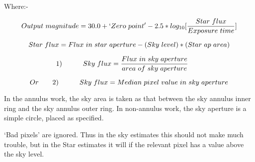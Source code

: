 \begin{small}
{{   Where:-

   $$ Output{\hspace{0.3em}}magnitude = 30.0 +
                                        `Zero{\hspace{0.3em}}point' -
      2.5*log_{10}[\frac{Star{\hspace{0.3em}}flux}{Exposure{
      \hspace{0.3em}}time}] $$

$$   Star{\hspace{0.3em}}flux = Flux{\hspace{0.3em}}in{
         \hspace{0.3em}}star{\hspace{0.3em}}aperture -
         (Sky{\hspace{0.3em}}level)*(Star{\hspace{0.3em}}ap{
         \hspace{0.3em}}area) $$

$$ {\hspace*{-2em}}     1) {\hspace*{3em}}   Sky{\hspace{0.3em}}flux  =
         \frac{Flux{\hspace{0.3em}}in{\hspace{0.3em}}sky{
         \hspace{0.3em}}aperture}{area{\hspace{0.3em}}of{
         \hspace{0.3em}}sky{\hspace{0.3em}}aperture} $$

$$   Or {\hspace*{2em}}   2) {\hspace*{3em}} Sky{\hspace{0.3em}}flux  =
     Median{\hspace{0.3em}}pixel{\hspace{0.3em}}value{
     \hspace{0.3em}}in{\hspace{0.3em}}sky{\hspace{0.3em}}aperture  $$

   In the annulus work, the sky area is taken as that between the
   sky annulus inner ring and the sky annulus outer ring.
   In non-annulus work, the sky aperture is a simple circle, placed
   as specified.

   `Bad pixels' are ignored. Thus in the sky estimates this should
   not make much trouble, but in the Star estimates it will if the
   relevant pixel has a value above the sky level.

}}
\end{small}
